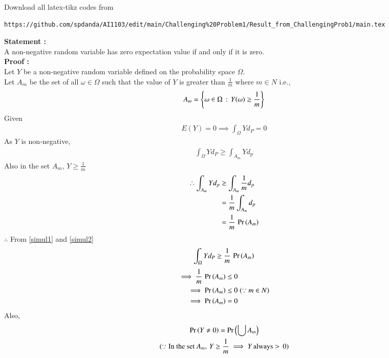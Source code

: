 \documentclass[journal,12pt,twocolumn]{IEEEtran}
\begin{document}
\author{Name: Sai Pravallika Danda, Roll Number: CS20BTECH11013}
\maketitle
\newpage
\bigskip
\renewcommand{\thefigure}{\theenumi}
\renewcommand{\thetable}{\theenumi}
Download all latex-tikz codes from 
%
\begin{lstlisting}https://github.com/spdanda/AI1103/edit/main/Challenging%20Problem1/Result_from_ChallengingProb1/main.tex
\end{lstlisting}
\large\textbf{Statement :}\\
A non-negative random variable has zero expectation value if and only if it is zero.\\
\textbf{Proof :}\\
Let $Y$ be a non-negative random variable defined on the probability space $\Omega$.\\
Let $A_m$ be the set of all $\omega \in \Omega$ such that the value of $Y$ is greater than $\frac{1}{m}$ where $m \in N$ i.e.,
$$A_m = \left\{\omega \in \Omega\,:\,Y(\omega) \geq \frac{1}{m}\right\}$$
Given
\begin{align}
    E(Y) =0 \implies \int_\Omega Yd_P =0
\end{align}
As $Y$ is non-negative,
\begin{align}
    \int_\Omega Yd_P \geq \int_{A_m}Yd_p \label{simul1}
\end{align}
Also in the set $A_m$, $Y \geq \frac{1}{m}$
\begin{align}
  \therefore \int_{A_m}Yd_p  &\geq  \int_{A_m}\frac{1}{m}d_p\\
                             &= \frac{1}{m}\int_{A_m}d_p\\
                             &= \frac{1}{m}\,\Pr\left(A_m\right) \label{simul2}
\end{align}
$\therefore$ From \eqref{simul1} and \eqref{simul2}
\begin{align}
  \int_\Omega Yd_P \geq \frac{1}{m}\,\Pr\left(A_m\right)
\end{align}
\begin{align}
    \implies \frac{1}{m}\,\Pr\left(A_m\right) &\leq 0\\
    \implies \Pr\left(A_m\right) &\leq 0\;(\because m \in N)\\
    \implies \Pr\left(A_m\right) &= 0
\end{align}
Also,
\begin{multline}
    \Pr\left(Y \neq 0\right) = \Pr\left(\bigcup A_m\right)\\(\because \text{In the set } A_m,\,Y \geq \frac{1}{m} \implies Y\,\text{always}> \,0)
\end{multline}
\end{document}

